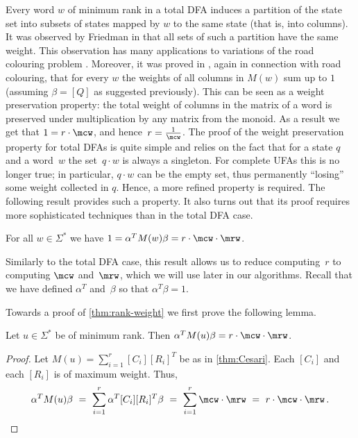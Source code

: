 Every word $w$ of minimum rank in a total DFA induces a partition of the state set into subsets of states mapped by $w$ to the same state (that is, into columns). It was observed by Friedman in \cite{Friedman1990} that all sets of such a partition have the same weight. This observation has many applications to variations of the road colouring problem \cite{Friedman1990,Kari2001,Gusev2016,Kari2019}. Moreover, it was proved in \cite[Theorem 6]{Gusev2016}, again in connection with road colouring, that for every $w$ the weights of all columns in $M(w)$ sum up to $1$ (assuming $\beta = [Q]$ as suggested previously). 
This can be seen as a weight preservation property: the total weight of columns in the matrix of a word is preserved under multiplication by any matrix from the monoid.
As a result we get that $1 = r \cdot \mcw$, and hence~$r = \frac{1}{\mcw}$. The proof of the weight preservation property for total DFAs is quite simple and relies on the fact that for a state $q$ and a word~$w$ the set~$q \cdot w$ is always a singleton. For complete UFAs this is no longer true; in particular, $q \cdot w$ can be the empty set, thus permanently ``losing'' some weight collected in $q$. Hence, a more refined property is required. The following result provides such a property.
It also turns out that its proof requires more sophisticated techniques than in the total DFA case.


\begin{thm} \label{thm:rank-weight}
For all $w \in \Sigma^*$ we have $1 = \alpha^T M(w) \beta = r \cdot \mcw \cdot \mrw$.
\end{thm}

\noindent
Similarly to the total DFA case, this result allows us to reduce computing~$r$ to computing $\mcw$ and~$\mrw$, which we will use later in our algorithms. Recall that we have defined $\alpha^T$ and~$\beta$ so that $\alpha^T \beta = 1$.



Towards a proof of \autoref{thm:rank-weight} we first prove the following lemma.

\begin{lem} \label{lem:minrank-weight}
Let $u \in \Sigma^*$ be of minimum rank.
Then $\alpha^T M(u) \beta = r \cdot \mcw \cdot \mrw$.
\end{lem}
\begin{proof}
Let $M(u) = \sum_{i=1}^r [C_i] [R_i]^T$ be as in \autoref{thm:Cesari}.
Each $[C_i]$ and each $[R_i]$ is of maximum weight.
Thus,
\[
 \alpha^T M(u) \beta \ = \ \sum_{i=1}^r \alpha^T [C_i] [R_i]^T \beta \ = \ \sum_{i=1}^r \mcw \cdot \mrw \ = \ r \cdot \mcw \cdot \mrw\,. \qedhere
\]
\end{proof}

